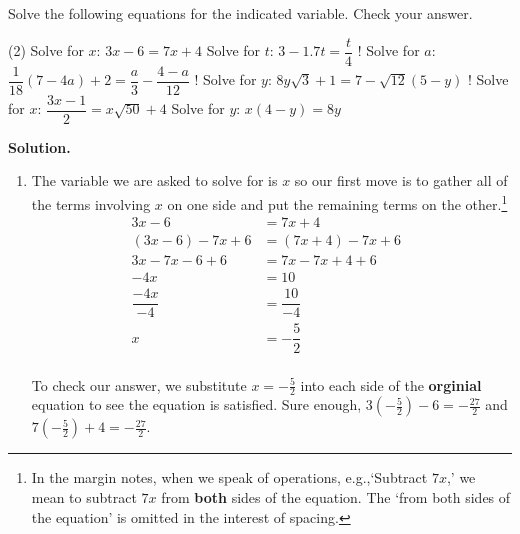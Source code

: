 \begin{ex}\label{lineareqnreview}  Solve the following equations for the indicated variable.  Check your answer.

\begin{tasks}(2)
\task  Solve for $x$: $3x - 6 = 7x + 4$
\task  Solve for $t$: $3 - 1.7t = \dfrac{t}{4}$
\task!  Solve for $a$: $\dfrac{1}{18}(7 - 4a) + 2 = \dfrac{a}{3} - \dfrac{4-a}{12}$
\task!  Solve for $y$:  $8 y \sqrt{3} + 1 = 7 - \sqrt{12}(5 - y)$
\task!  Solve for $x$: $\dfrac{3x-1}{2} = x\sqrt{50} + 4$
\task  Solve for $y$:  $x(4-y) = 8y$
\end{tasks}

{\bf Solution.} 

\begin{enumerate}

\item  The variable we are asked to solve for is $x$ so our first move is to gather all of the terms involving $x$ on one side and put the remaining terms on the other.\footnote{In the margin notes, when we speak of operations, e.g.,`Subtract $7x$,' we mean to subtract $7x$ from \textbf{both} sides of the equation.  The `from both sides of the equation' is omitted in the interest of spacing.}
\begin{align*}
3x - 6 &  = 7x + 4 & \\
(3x-6) - 7x + 6 &  = (7x+4) -7x +6 \tag{Subtract $7x$, add $6$} \\
3x - 7x - 6 + 6 & = 7x - 7x + 4 + 6 & \tag{Rearrange terms} \\
-4x & = 10 \tag{$3x-7x = (3-7)x = -4x$} \\
\dfrac{-4x}{-4} & = \dfrac{10}{-4} \tag{Divide by the coefficient of $x$} \\
x & = -\dfrac{5}{2} \tag{Reduce to lowest terms} \\
\end{align*}
											
To check our answer, we substitute $x = -\frac{5}{2}$ into each side of the \textbf{orginial} equation to see the equation is satisfied.  Sure enough, $3\left(-\frac{5}{2}\right) - 6 = -\frac{27}{2}$ and $7\left(-\frac{5}{2}\right) + 4 = -\frac{27}{2}$.


\end{enumerate}
\end{ex}
